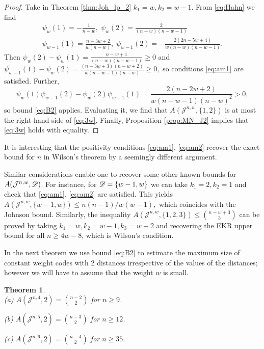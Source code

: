 \documentclass{amsart}
\newtheorem{theoremenv}[definitionenv]{Theorem}
\newenvironment{theorem}{\begin{theoremenv}\rm}{\end{theoremenv}}
\newcommand\nd{\noindent}
\newcommand{\cJ}{\mathcal{J}}
\begin{document}
\begin{proof}
Take in Theorem \ref{thm:Joh_lp_2} $k_1=w,k_2=w-1.$ From \eqref{eq:Hahn} we find
  \begin{gather*}
   \psi_w(1)=-\frac 1{n-w},\;\psi_w(2)=\frac 2{(n-w)(n-w-1)}\\
   \psi_{w-1}(1)=\frac{n-3w+2}{w(n-w)}, \; \psi_{w-1}(2)=-\frac{2(2n-5w+4)}{w(n-w)(n-w-1)}.  
  \end{gather*}
Then $\psi_{w}(2)-\psi_w(1)=\frac{n-w+1}{(n-w)(n-w-1)}\ge 0$ and $\psi_{w-1}(1)-\psi_w(2)=\frac{(n-3 w+3) (n-w+2)}{w (n-w-1) (n-w)}\ge 0,$
so conditions \eqref{eq:am1} are satisfied. Further, 
   $$
   \psi_w(1)\psi_{w-1}(2)-\psi_w(2)\psi_{w-1}(1)=\frac{2 (n-2 w+2)}{w (n-w-1) (n-w)^2}>0,
   $$
so bound \eqref{eq:B2} applies. Evaluating it, we find that $A(\cJ^{n,w}, \{1, 2\})$
is at most the right-hand side of \eqref{eq:3w}. Finally, Proposition \ref{prop:MN_J2} implies that \eqref{eq:3w} holds with equality.
  \end{proof}
It is interesting that the positivity conditions \eqref{eq:am1}, \eqref{eq:am2} recover the exact bound for $n$ in Wilson's theorem by a seemingly different argument.

Similar considerations enable one to recover some other known bounds for $A(\cJ^{n,w},\sD)$. For instance, for $\mathscr{D}=\{w-1,w\}$ we can take $k_1=2,k_2=1$ and check that \eqref{eq:am1}, \eqref{eq:am2} are satisfied. This yields $A(\cJ^{n,w},\{w-1,w\})\le n(n-1)/w(w-1),$ which coincides with the Johnson bound. Similarly, the inequality $A(\cJ^{n,w},\{1,2,3\})\le \binom{n-w+3}3$ can be proved by taking $k_1=w,k_2=w-1,k_3=w-2$ and recovering the EKR upper bound for all $n\ge 4w-8$,
which is Wilson's condition. 

In the next theorem we use bound \eqref{eq:B2} to estimate the maximum size of constant weight codes with 2 distances irrespective of the values of the distances; however we will have to assume that the weight $w$ is small.

\begin{theorem}\label{thm:Johnson2}\hfill\\
(a) $A(\cJ^{n, 4}, 2) = \binom{n-2}{2}$ for $n \geq 9$.

\nd(b) $A(\cJ^{n, 5}, 2) = \binom{n-3}{2}$ for $n \geq 12$.

\nd(c) $A(\cJ^{n, 6}, 2) = \binom{n-4}{2}$ for $n \geq 35$.
\end{theorem}
\end{document}
